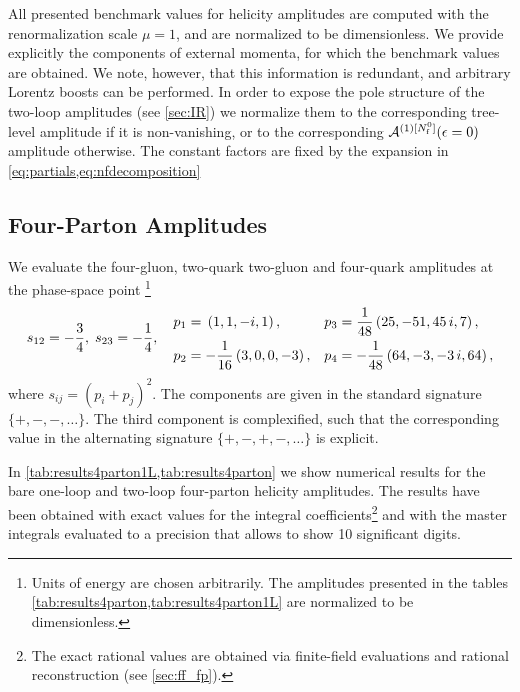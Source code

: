 All presented benchmark values for helicity amplitudes are computed with the renormalization scale $\mu=1$,
and are normalized to be dimensionless.
We provide explicitly the components of external momenta, for which the benchmark values are obtained.
We note, however, that this information is redundant, and arbitrary Lorentz boosts
can be performed.
In order to expose the pole structure of the two-loop amplitudes (see \cref{sec:IR}) we normalize them to
the corresponding tree-level amplitude if
it is non-vanishing, or to the corresponding $\mathcal{A}^{(1)[N_\mathrm{f}^0]}(\epsilon=0)$ amplitude otherwise.
The constant factors are fixed by the expansion in \cref{eq:partials,eq:nfdecomposition}

\subsection{Four-Parton Amplitudes}

We evaluate the four-gluon, two-quark two-gluon and four-quark
amplitudes at the phase-space point%
\footnote{Units of energy are chosen arbitrarily.
  The amplitudes presented in the tables \cref{tab:results4parton,tab:results4parton1L}
  are normalized to be dimensionless.
}
%
\begin{equation}
  s_{12}=-\frac{3}{4}, \; s_{23}=-\frac{1}{4},
  \quad
  \begin{aligned}[c]
    p_1 &= \vphantom{\frac{1}{48}}\left(1,1,-i,1\right), \\
    p_2 &= -\frac{1}{16}\left(3,0,0,-3\right), \\
  \end{aligned}
  \quad
  \begin{aligned}[c]
    p_3 &= \frac{1}{48}\left(25,-51,45\,i,7\right),\\
    p_4 &= -\frac{1}{48}\left(64,-3,-3\,i, 64\right), \\
  \end{aligned}
  \label{eq:EvalPoint4}
\end{equation}
where $s_{ij}=(p_i+p_j)^2$. The components are given in the standard signature $\{+,-,-,\ldots{}\}$.
The third component is complexified, such that the corresponding value in the alternating signature $\{+,-,+,-,\ldots{}\}$ 
is explicit.

In \cref{tab:results4parton1L,tab:results4parton} we show numerical results for
the bare one-loop and two-loop four-parton helicity amplitudes.
The results have been obtained with exact values for the 
integral coefficients\footnote{
  The exact rational values are obtained via finite-field evaluations and rational reconstruction (see \cref{sec:ff_fp}).
} 
and with the master integrals 
evaluated to a precision that allows to show 10
significant digits.

